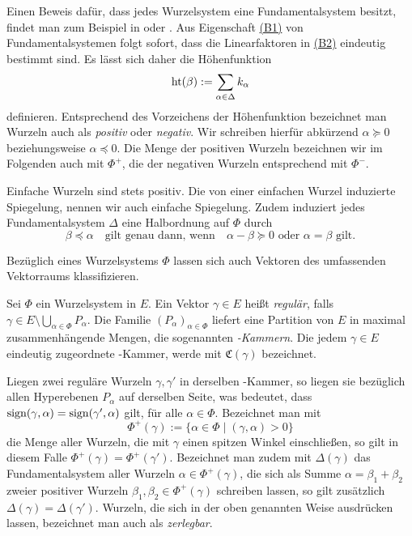 \begin{bem}
  Einen Beweis dafür, dass jedes Wurzelsystem eine Fundamentalsystem besitzt, findet man zum Beispiel in \cite[S.48]{humphreys1972introduction} oder \cite[S.116]{erdmann2006introduction}.
  Aus Eigenschaft \hyperref[it:B1]{(B1)} von Fundamentalsystemen folgt sofort, dass die Linearfaktoren in \hyperref[it:B1]{(B2)} eindeutig bestimmt sind. 
  Es lässt sich daher die Höhenfunktion 
  \begin{displaymath}
    \operatorname{ht}(\beta) := \sum_{\alpha \in \Delta} k_\alpha 
  \end{displaymath}
  definieren.
  Entsprechend des Vorzeichens der Höhenfunktion bezeichnet man Wurzeln auch als \emph{positiv} oder \emph{negativ}.
  Wir schreiben hierfür abkürzend $\alpha \succeq 0$ beziehungsweise $\alpha \preceq 0$.
  Die Menge der positiven Wurzeln bezeichnen wir im Folgenden auch mit $\Phi^+$, die der negativen Wurzeln entsprechend mit $\Phi^-$.

  Einfache Wurzeln sind stets positiv.
  Die von einer einfachen Wurzel induzierte Spiegelung, nennen wir auch einfache Spiegelung.
 Zudem induziert jedes Fundamentalsystem $\Delta$ eine Halbordnung auf $\Phi$ durch
 \begin{displaymath}
   \beta \preceq \alpha \quad \text{gilt genau dann, wenn} \quad \alpha - \beta \succeq 0 \text{ oder } \alpha = \beta \text{ gilt}.
 \end{displaymath}
\end{bem}

Bezüglich eines Wurzelsystems $\Phi$ lassen sich auch Vektoren des umfassenden Vektorraums klassifizieren.

\begin{defn}
  Sei $\Phi$ ein Wurzelsystem in $E$.
  Ein Vektor $\gamma \in E$ heißt \emph{regulär}, falls $\gamma \in E \setminus \bigcup_{\alpha \in \Phi} P_\alpha$.
  Die Familie $(P_\alpha)_{\alpha \in \Phi}$ liefert eine Partition von $E$ in maximal zusammenhängende Mengen, die sogenannten \emph{\weyl\hyp{}Kammern}.
  Die jedem $\gamma \in E$ eindeutig zugeordnete \weyl\hyp{}Kammer, werde mit $\mathfrak{C}(\gamma)$ bezeichnet.
\end{defn}

Liegen zwei reguläre Wurzeln $\gamma, \gamma'$ in derselben \weyl\hyp{}Kammer, so liegen sie bezüglich allen Hyperebenen $P_\alpha$ auf derselben Seite, was bedeutet, dass $\operatorname{sign} (\gamma, \alpha) = \operatorname{sign}( \gamma', \alpha)$ gilt, für alle $\alpha \in \Phi$.
Bezeichnet man mit
\begin{displaymath}
  \Phi^+(\gamma) := \{ \alpha \in \Phi \mid (\gamma, \alpha) > 0 \}
\end{displaymath}
die Menge aller Wurzeln, die mit $\gamma$ einen spitzen Winkel einschließen, so gilt in diesem Falle $\Phi^+(\gamma) = \Phi^+(\gamma')$.
Bezeichnet man zudem mit $\Delta(\gamma)$ das Fundamentalsystem aller Wurzeln $\alpha \in \Phi^+(\gamma)$, die sich als Summe $\alpha = \beta_1 + \beta_2$ zweier positiver Wurzeln $\beta_1, \beta_2 \in \Phi^+(\gamma)$ schreiben lassen, so gilt zusätzlich $\Delta(\gamma) = \Delta(\gamma')$. 
Wurzeln, die sich in der oben genannten Weise ausdrücken lassen, bezeichnet man auch als \emph{zerlegbar}.


